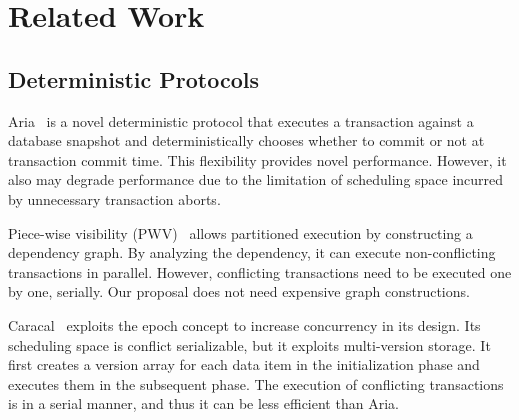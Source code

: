 \documentclass[english,preprint,JIP]{ipsj}
\begin{document}
\section{Related Work}
\subsection{Deterministic Protocols}
Aria~\cite{lu2020aria} is a novel deterministic protocol that executes a transaction against a database snapshot and deterministically chooses whether to commit or not at transaction commit time. This flexibility provides novel performance. However, it also may degrade performance due to the limitation of scheduling space incurred by unnecessary transaction aborts.
%

Piece-wise visibility (PWV)~\cite{faleiro17} allows partitioned execution by constructing a dependency graph. By analyzing the dependency, it can execute non-conflicting transactions in parallel. However, conflicting transactions need to be executed one by one, serially. Our proposal does not need expensive graph constructions.
%

%

Caracal~\cite{qin2021caracal} exploits the epoch concept to increase concurrency in its design. Its scheduling space is conflict serializable, but it exploits multi-version storage. It first creates a version array for each data item in the initialization phase and executes them in the subsequent phase. 
%
The execution of conflicting transactions is in a serial manner, and thus it can be less efficient than Aria.
%
\end{document}
